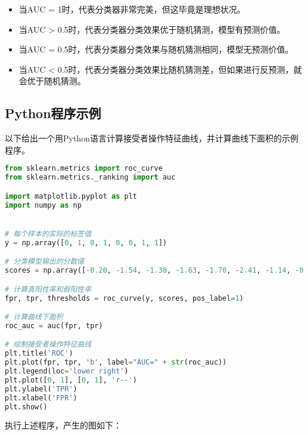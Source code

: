 \begin{itemize}
\item 当AUC = 1时，代表分类器非常完美，但这毕竟是理想状况。
\item 当AUC > 0.5时，代表分类器分类效果优于随机猜测，模型有预测价值。
\item 当AUC = 0.5时，代表分类器分类效果与随机猜测相同，模型无预测价值。
\item 当AUC < 0.5时，代表分类器分类效果比随机猜测差，但如果进行反预测，就会优于随机猜测。
\end{itemize}

\subsection{Python程序示例}
以下给出一个用Python语言计算接受者操作特征曲线，并计算曲线下面积的示例程序。
\begin{lstlisting}[language=python]
from sklearn.metrics import roc_curve
from sklearn.metrics._ranking import auc

import matplotlib.pyplot as plt
import numpy as np


# 每个样本的实际的标签值
y = np.array([0, 1, 0, 1, 0, 0, 1, 1]) 

# 分类模型输出的分数值
scores = np.array([-0.20, -1.54, -1.38, -1.63, -1.70, -2.41, -1.14, -0.79])

# 计算真阳性率和假阳性率
fpr, tpr, thresholds = roc_curve(y, scores, pos_label=1)

# 计算曲线下面积
roc_auc = auc(fpr, tpr)

# 绘制接受者操作特征曲线
plt.title('ROC')
plt.plot(fpr, tpr, 'b', label="AUC=" + str(roc_auc))
plt.legend(loc='lower right')
plt.plot([0, 1], [0, 1], 'r--')
plt.ylabel('TPR')
plt.xlabel('FPR')
plt.show()
\end{lstlisting}

执行上述程序，产生的图如下：
